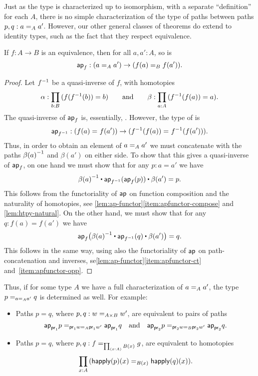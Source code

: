 %
Just as the type  is characterized up to isomorphism, with
a separate ``definition'' for each $A$, there is no simple
characterization of the type  of paths between
paths $p,q : \id[A]{a}{a'}$.
However, our other general classes of theorems do extend to identity types, such as the fact that they respect equivalence.

\begin{thm}\label{thm:paths-respects-equiv}
  If $f : A \to B$ is an equivalence, then for all $a,a':A$, so is
  \[\apfunc{f} : (\id[A]{a}{a'}) \to (\id[B]{f(a)}{f(a')}).\]
\end{thm}
\begin{proof}
  Let $\opp f$ be a quasi-inverse of $f$, with homotopies
  \begin{equation*}
    \alpha:\prd{b:B} (f(\opp f(b))=b)
    \qquad\text{and}\qquad
    \beta:\prd{a:A} (\opp f(f(a)) = a).
  \end{equation*}
  The quasi-inverse of $\apfunc{f}$ is, essentially, .
  However, the type of  is
  \[\apfunc{\opp f} : (\id{f(a)}{f(a')}) \to (\id{\opp f(f(a))}{\opp f(f(a'))}).\]
  Thus, in order to obtain an element of $\id[A]{a}{a'}$ we must concatenate with the paths $\opp{\beta(a)}$ and $\beta (a')$ on either side.
  To show that this gives a quasi-inverse of $\apfunc{f}$, on one hand we must show that for any $p:a=a'$ we have
  \[ \opp{\beta(a)} \ct \apfunc{\opp f}(\apfunc{f}(p)) \ct \beta(a') = p. \]
  This follows from the functoriality of $\apfunc{}$ on function composition and the naturality of homotopies, see \autoref{lem:ap-functor}\ref{item:apfunctor-compose} and \autoref{lem:htpy-natural}.
  On the other hand, we must show that for any $q:f(a)=f(a')$ we have
  \[ \apfunc{f}\big( \opp{\beta(a)} \ct \apfunc{\opp f}(q) \ct \beta(a') \big) = q. \]
  This follows in the same way, using also the functoriality of $\apfunc{}$ on path-concatenation and inverses, se\autoref{lem:ap-functor}\ref{item:apfunctor-ct} and~\ref{item:apfunctor-opp}.
\end{proof}

Thus, if for some type $A$ we have a full characterization of $\id[A]{a}{a'}$, the type $\id[{\id[A]{a}{a'}}]{p}{q}$ is determined as well.  
For example:
\begin{itemize}
\item Paths $p = q$, where $p,q : \id[A \times B]{w}{w'}$, are equivalent to pairs of paths
  \[\id[{\id[A]{\proj{1} w}{\proj{1} w'}}]{\projpath{1}{p}}{\projpath{1}{q}}
  \quad\text{and}\quad
  \id[{\id[B]{\proj{2} w}{\proj{2} w'}}]{\projpath{2}{p}}{\projpath{2}{q}}.
  \]
\item Paths $p = q$, where $p,q : \id[\prd{x:A} B(x)]{f}{g}$, are equivalent to homotopies
  \[\prd{x:A} (\id[B(x)] {\happly(p)(x)}{\happly(q)(x)}).\]
\end{itemize}


